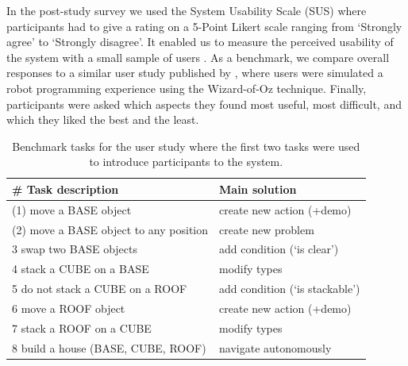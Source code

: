 In the post-study survey we used the System Usability Scale (SUS) \cite{brooke1996sus} where participants had to give a rating on a 5-Point Likert scale ranging from `Strongly agree' to `Strongly disagree'.
It enabled us to measure the perceived usability of the system with a small sample of users \cite{tullis2004comparison}.
As a benchmark, we compare overall responses to a similar user study published by \citet{liang2017evaluation}, where users were simulated a robot programming experience using the Wizard-of-Oz technique.
Finally, participants were asked which aspects they found most useful, most difficult, and which they liked the best and the least.



\begin{table}[t]
\centering
\caption{Benchmark tasks for the user study where the first two tasks were used to introduce participants to the system.}
\label{table:userstudytasks}
\begin{center}
\begin{tabular}{ll}
\# Task description & Main solution \\ \hline
(1) move a BASE object & create new action (+demo) \\
(2) move a BASE object to any position & create new problem \\
 3 swap two BASE objects & add condition (`is clear') \\
 4 stack a CUBE on a BASE & modify types\\
 5 do not stack a CUBE on a ROOF & add condition (`is stackable')\\
 6 move a ROOF object & create new action (+demo) \\
 7 stack a ROOF on a CUBE & modify types  \\
 8 build a house (BASE, CUBE, ROOF) & navigate autonomously \\ \hline
\end{tabular}
\end{center}
\end{table}
